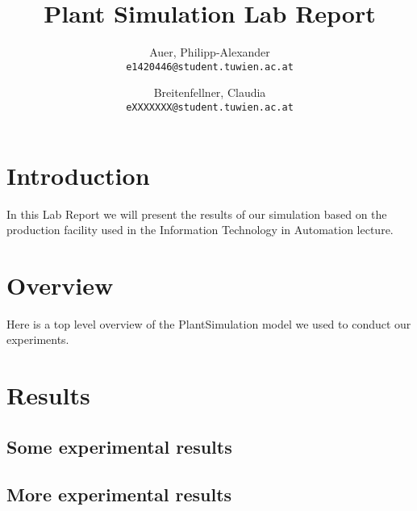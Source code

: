 \documentclass{report}
\begin{document}
\title{Plant Simulation Lab Report}
\author{
	Auer, Philipp-Alexander\\
	\texttt{e1420446@student.tuwien.ac.at}
	\and
	Breitenfellner, Claudia\\
	\texttt{eXXXXXXX@student.tuwien.ac.at}
}

\maketitle
\tableofcontents
\section{Introduction}
In this Lab Report we will present the results of our simulation based on the production facility used in the Information Technology in Automation lecture.

\section{Overview}
Here is a top level overview of the PlantSimulation model we used to conduct our experiments.

\section{Results}
\subsection{Some experimental results}
\subsection{More experimental results}
\end{document}
